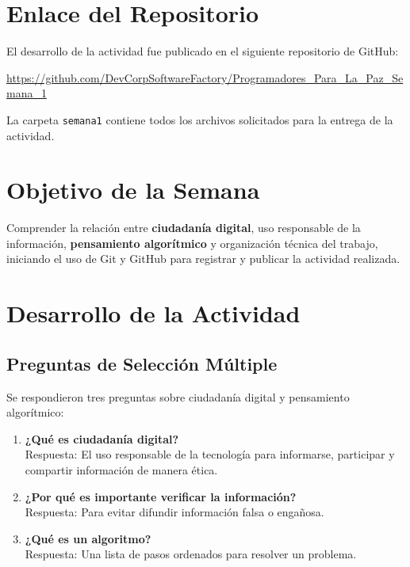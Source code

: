 \documentclass[12pt,a4paper]{article}
\begin{document}
\section{Enlace del Repositorio}

El desarrollo de la actividad fue publicado en el siguiente repositorio de GitHub:

\vspace{0.5cm}

\begin{center}
\large
\url{https://github.com/DevCorpSoftwareFactory/Programadores_Para_La_Paz_Semana_1}
\end{center}

\vspace{0.5cm}

\noindent La carpeta \texttt{semana1} contiene todos los archivos solicitados para la entrega de la actividad.

\section{Objetivo de la Semana}

Comprender la relación entre \textbf{ciudadanía digital}, uso responsable de la información, \textbf{pensamiento algorítmico} y organización técnica del trabajo, iniciando el uso de Git y GitHub para registrar y publicar la actividad realizada.

\section{Desarrollo de la Actividad}

\subsection{Preguntas de Selección Múltiple}

Se respondieron tres preguntas sobre ciudadanía digital y pensamiento algorítmico:

\begin{enumerate}[label=\textbf{\arabic*.}]
    \item \textbf{¿Qué es ciudadanía digital?} \\
    Respuesta: El uso responsable de la tecnología para informarse, participar y compartir información de manera ética.
    
    \item \textbf{¿Por qué es importante verificar la información?} \\
    Respuesta: Para evitar difundir información falsa o engañosa.
    
    \item \textbf{¿Qué es un algoritmo?} \\
    Respuesta: Una lista de pasos ordenados para resolver un problema.
\end{enumerate}
\end{document}
